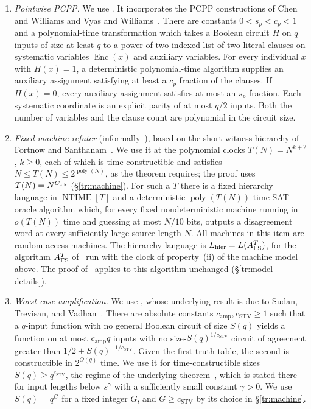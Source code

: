 \documentclass[11pt,letterpaper]{article}
\theoremstyle{definition}
\theoremstyle{remark}
\begin{document}
\begin{enumerate}
\item \emph{Pointwise PCPP.} We use \cite[Lemma~3.11]{CLW}.
It incorporates the PCPP constructions of Chen and Williams
\cite{ChenWilliams} and Vyas and Williams~\cite{VyasWilliams}.
There are constants $0<s_p<c_p<1$ and a polynomial-time transformation
which takes a Boolean circuit $H$ on $q$ inputs of size at least $q$ to
a power-of-two indexed list of two-literal clauses on systematic
variables $\operatorname{Enc}(x)$ and auxiliary variables.
For every individual $x$ with $H(x)=1$, a deterministic polynomial-time
algorithm supplies an auxiliary assignment satisfying at least a
$c_p$ fraction of the clauses. If $H(x)=0$, every auxiliary assignment
satisfies at most an $s_p$ fraction. Each systematic coordinate is an
explicit parity of at most $q/2$ inputs. Both the number of variables
and the clause count are polynomial in the circuit size.

\item \emph{Fixed-machine refuter} \cite[Theorem~4.6]{CLW}
(informally~\cite[Theorem~1.13]{CLW}), based
on the short-witness hierarchy of Fortnow and
Santhanam~\cite{FortnowSanthanam}.
We use it at the polynomial clocks $T(N)=N^{k+2}$, $k\ge0$, each of
which is time-constructible and satisfies
$N\le T(N)\le2^{\operatorname{poly}(N)}$, as the theorem requires; the
proof uses $T(N)=N^{C_{\rm clk}}$ (\S\ref{tr:machine}).
For such a $T$
there is a fixed hierarchy language in $\operatorname{NTIME}[T]$ and
a deterministic $\operatorname{poly}(T(N))$-time SAT-oracle algorithm
which, for every fixed nondeterministic machine running in $o(T(N))$
time and guessing at most $N/10$ bits, outputs a disagreement word
at every sufficiently large source length $N$. All machines in this
item are random-access machines. The hierarchy language is
$L_{\rm hier}=L(A^T_{\rm FS})$, for the algorithm $A^T_{\rm FS}$
of~\cite[Definition~4.2]{CLW} run with the clock of property~(ii) of
the machine model above. The proof of~\cite[Theorem~4.6]{CLW} applies
to this algorithm unchanged (\S\ref{tr:model-details}).

\item \emph{Worst-case amplification.} We use
\cite[Lemma~3.9]{CLW}, whose underlying result is due to
Sudan, Trevisan, and Vadhan~\cite{STV}.
There are absolute constants $c_{\mathrm{amp}},c_{\mathrm{STV}}\ge1$
such that a $q$-input function with no general Boolean circuit of
size $S(q)$ yields a function on at most $c_{\mathrm{amp}}q$ inputs
with no size-$S(q)^{1/c_{\mathrm{STV}}}$ circuit of agreement greater
than $1/2+S(q)^{-1/c_{\mathrm{STV}}}$. Given the first truth table,
the second is constructible in $2^{O(q)}$ time. We use it for
time-constructible sizes $S(q)\ge q^{c_{\mathrm{STV}}}$, the regime of
the underlying theorem~\cite[Theorem~24]{STV}, which is stated there
for input lengths below $s^\gamma$ with a sufficiently small constant
$\gamma>0$. We use
$S(q)=q^G$ for a fixed integer $G$, and $G\ge c_{\mathrm{STV}}$ by its
choice in \S\ref{tr:machine}.
\end{enumerate}
\end{document}

